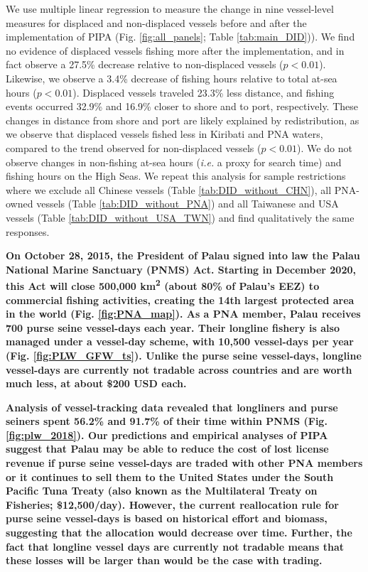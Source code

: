 \documentclass[12pt]{article}
\begin{document}
We use multiple linear regression to measure the change in nine vessel-level measures for displaced and non-displaced vessels before and after the implementation of PIPA (Fig. \ref{fig:all_panels}; Table \ref{tab:main_DID})). We find no evidence of displaced vessels fishing more after the implementation, and in fact observe a 27.5\% decrease relative to non-displaced vessels ($p < 0.01$). Likewise, we observe a 3.4\% decrease of fishing hours relative to total at-sea hours ($p < 0.01$). Displaced vessels traveled 23.3\% less distance, and fishing events occurred 32.9\% and 16.9\% closer to shore and to port, respectively. These changes in distance from shore and port are likely explained by redistribution, as we observe that displaced vessels fished less in Kiribati and PNA waters, compared to the trend observed for non-displaced vessels ($p < 0.01$). We do not observe changes in non-fishing at-sea hours (\emph{i.e.} a proxy for search time) and fishing hours on the High Seas. We repeat this analysis for sample restrictions where we exclude all Chinese vessels (Table \ref{tab:DID_without_CHN}), all PNA-owned vessels (Table \ref{tab:DID_without_PNA}) and all Taiwanese and USA vessels (Table \ref{tab:DID_without_USA_TWN}) and find qualitatively the same responses.

\textbf{On October 28, 2015, the President of Palau signed into law the Palau National Marine Sanctuary (PNMS) Act. Starting in December 2020, this Act will close 500,000 km\textsuperscript{2} (about 80\% of Palau’s EEZ) to commercial fishing activities, creating the 14th largest protected area in the world (Fig. \ref{fig:PNA_map}). As a PNA member, Palau receives 700 purse seine vessel-days each year. Their longline fishery is also managed under a vessel-day scheme, with 10,500 vessel-days per year (Fig. \ref{fig:PLW_GFW_ts}). Unlike the purse seine vessel-days, longline vessel-days are currently not tradable across countries and are worth much less, at about \$200 USD each.}

\textbf{Analysis of vessel-tracking data revealed that longliners and purse seiners spent 56.2\% and 91.7\% of their time within PNMS (Fig. \ref{fig:plw_2018}). Our predictions and empirical analyses of PIPA suggest that Palau may be able to reduce the cost of lost license revenue if purse seine vessel-days are traded with other PNA members or it continues to sell them to the United States under the South Pacific Tuna Treaty (also known as the Multilateral Treaty on Fisheries; \$12,500/day). However, the current reallocation rule for purse seine vessel-days is based on historical effort and biomass, suggesting that the allocation would decrease over time. Further, the fact that longline vessel days are currently not tradable means that these losses will be larger than would be the case with trading.}
\end{document}
